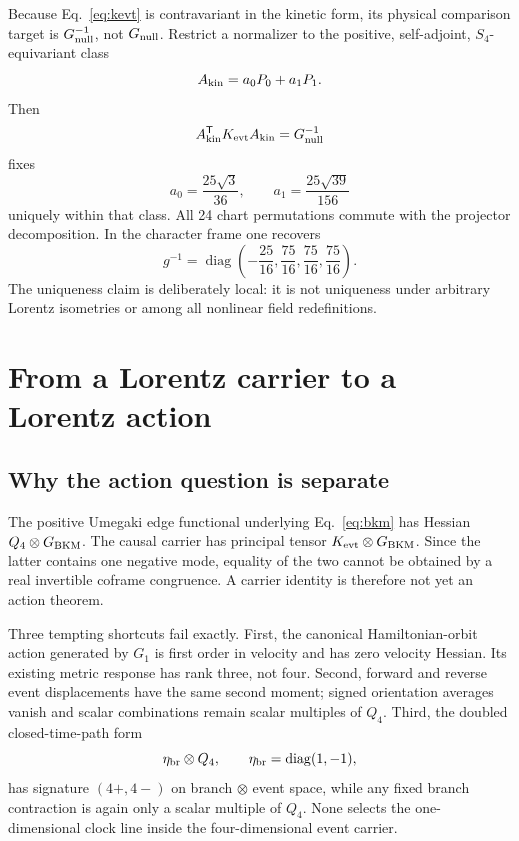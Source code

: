 \documentclass[11pt]{article}
\theoremstyle{definition}
\theoremstyle{remark}
\begin{document}
Because Eq.~\eqref{eq:kevt} is contravariant in the kinetic form, its physical comparison target is $G_{\rm null}^{-1}$, not $G_{\rm null}$. Restrict a normalizer to the positive, self-adjoint, $S_4$-equivariant class
\begin{equation}
 A_{\rm kin}=a_0P_0+a_1P_1.
\end{equation}
Then
\begin{equation}
 A_{\rm kin}^{\mathsf T}K_{\rm evt}A_{\rm kin}=G_{\rm null}^{-1}
\end{equation}
fixes
\begin{equation}
 a_0=\frac{25\sqrt3}{36},\qquad
 a_1=\frac{25\sqrt{39}}{156}
\end{equation}
uniquely within that class. All 24 chart permutations commute with the projector decomposition. In the character frame one recovers
\begin{equation}
 g^{-1}=\operatorname{diag}\!\left(
 -\frac{25}{16},\frac{75}{16},\frac{75}{16},\frac{75}{16}
 \right).
\end{equation}
The uniqueness claim is deliberately local: it is not uniqueness under arbitrary Lorentz isometries or among all nonlinear field redefinitions.

\section{From a Lorentz carrier to a Lorentz action}

\subsection{Why the action question is separate}

The positive Umegaki edge functional underlying Eq.~\eqref{eq:bkm} has Hessian $Q_4\otimes G_{\rm BKM}$. The causal carrier has principal tensor $K_{\rm evt}\otimes G_{\rm BKM}$. Since the latter contains one negative mode, equality of the two cannot be obtained by a real invertible coframe congruence. A carrier identity is therefore not yet an action theorem.

Three tempting shortcuts fail exactly. First, the canonical Hamiltonian-orbit action generated by $G_1$ is first order in velocity and has zero velocity Hessian. Its existing metric response has rank three, not four. Second, forward and reverse event displacements have the same second moment; signed orientation averages vanish and scalar combinations remain scalar multiples of $Q_4$. Third, the doubled closed-time-path form
\begin{equation}
 \eta_{\rm br}\otimes Q_4,
 \qquad \eta_{\rm br}=\operatorname{diag}(1,-1),
\end{equation}
has signature $(4+,4-)$ on branch $\otimes$ event space, while any fixed branch contraction is again only a scalar multiple of $Q_4$. None selects the one-dimensional clock line inside the four-dimensional event carrier.
\end{document}
